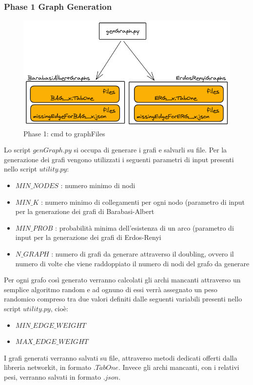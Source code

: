\documentclass[a4paper]{article}
\begin{document}
\subsubsection{Phase 1 Graph Generation}
\begin{figure}[!h]
\includegraphics[scale=0.35]{img/01_cmd_to_graphFiles}
\centering
\caption{Phase 1: cmd to graphFiles}
\end{figure}
Lo script $genGraph.py$ si occupa di generare i grafi e salvarli su file. 
Per la generazione dei grafi vengono utilizzati i seguenti parametri di input presenti nello script $utility.py$:
\begin{itemize}
\item $MIN\_NODES$ : numero minimo di nodi
\item $MIN\_K$ : numero minimo di collegamenti per ogni nodo (parametro di input per la generazione dei grafi di Barabasi-Albert
\item $MIN\_PROB$ : probabilità minima dell'esistenza di un arco (parametro di input per la generazione dei grafi di Erdos-Renyi
\item $N\_GRAPH$ : numero di grafi da generare attraverso il doubling, ovvero il numero di volte che viene raddoppiato il numero di nodi del grafo da generare
\end{itemize}
Per ogni grafo così generato verranno calcolati gli archi mancanti attraverso un semplice algoritmo random e ad ognuno di essi verrà assegnato un peso randomico compreso tra due valori definiti dalle seguenti variabili presenti nello script $utility.py$, cioè:
\begin{itemize}
\item $MIN\_EDGE\_WEIGHT$
\item $MAX\_EDGE\_WEIGHT$
\end{itemize}
I grafi generati verranno salvati su file, attraverso metodi dedicati offerti dalla libreria networkit, in formato $.TabOne$. Invece gli archi mancanti, con i relativi pesi, verranno salvati in formato $.json$.
\end{document}
